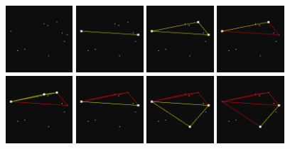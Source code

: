 \documentclass[]{article}
\begin{document}
\begin{figure}[H]
	\begin{center}
		\includegraphics[width=2.5cm]{qh2d/demo2d/frame0.png}
		\includegraphics[width=2.5cm]{qh2d/demo2d/frame1.png}
		\includegraphics[width=2.5cm]{qh2d/demo2d/frame2.png}
		\includegraphics[width=2.5cm]{qh2d/demo2d/frame3.png}
		\includegraphics[width=2.5cm]{qh2d/demo2d/frame4.png}
		\includegraphics[width=2.5cm]{qh2d/demo2d/frame5.png}
		\includegraphics[width=2.5cm]{qh2d/demo2d/frame6.png}
		\includegraphics[width=2.5cm]{qh2d/demo2d/frame7.png}

\end{center}
\end{figure}
\end{document}
